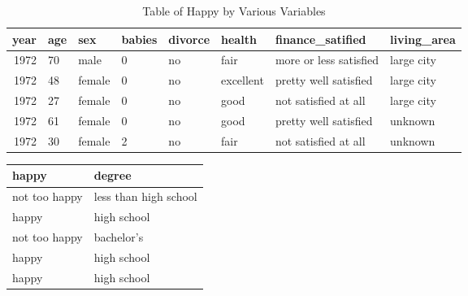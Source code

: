 \documentclass[
  letterpaper,
  DIV=11,
  numbers=noendperiod]{scrartcl}
\begin{document}
\begin{table}

\caption{Table of Happy by Various Variables}
\centering
\begin{tabular}[t]{r|l|l|l|l|l|l|l}
\hline
year & age & sex & babies & divorce & health & finance\_satified & living\_area\\
\hline
1972 & 70 & male & 0 & no & fair & more or less satisfied & large city\\
\hline
1972 & 48 & female & 0 & no & excellent & pretty well satisfied & large city\\
\hline
1972 & 27 & female & 0 & no & good & not satisfied at all & large city\\
\hline
1972 & 61 & female & 0 & no & good & pretty well satisfied & unknown\\
\hline
1972 & 30 & female & 2 & no & fair & not satisfied at all & unknown\\
\hline
\end{tabular}
\end{table}

\begin{table}
\centering
\begin{tabular}{l|l}
\hline
happy & degree\\
\hline
not too happy & less than high school\\
\hline
happy & high school\\
\hline
not too happy & bachelor's\\
\hline
happy & high school\\
\hline
happy & high school\\
\hline
\end{tabular}
\end{table}
\end{document}
